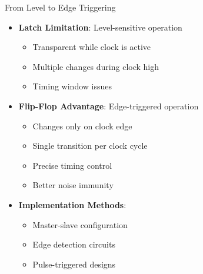 \documentclass[aspectratio=169,11pt]{beamer}
\newcommand{\concept}[1]{\textbf{\color{accentcolor}#1}}
\begin{document}
\begin{frame}{From Level to Edge Triggering}
\begin{itemize}
\item \concept{Latch Limitation}: Level-sensitive operation
\begin{itemize}
\item Transparent while clock is active
\item Multiple changes during clock high
\item Timing window issues
\end{itemize}
\vspace{0.5cm}
\item \concept{Flip-Flop Advantage}: Edge-triggered operation
\begin{itemize}
\item Changes only on clock edge
\item Single transition per clock cycle
\item Precise timing control
\item Better noise immunity
\end{itemize}
\vspace{0.3cm}
\item \concept{Implementation Methods}:
\begin{itemize}
\item Master-slave configuration
\item Edge detection circuits
\item Pulse-triggered designs
\end{itemize}
\end{itemize}
\end{frame}
\end{document}
